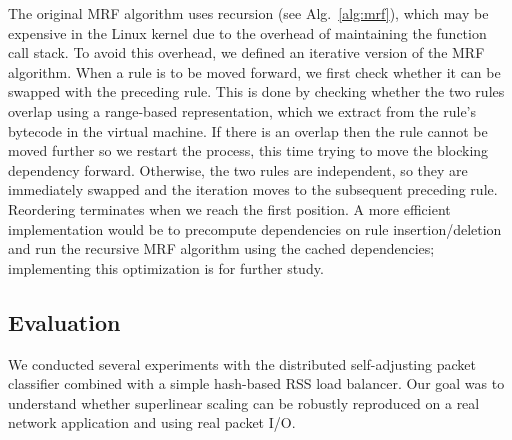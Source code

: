 The original MRF algorithm \cite{10228937} uses recursion (see Alg.~\ref{alg:mrf}), which may be expensive in the Linux kernel due to the overhead of maintaining the function call stack. To avoid this overhead, we defined an iterative version of the MRF algorithm. When a rule is to be moved forward, we first check whether it can be swapped with the preceding rule. This is done by checking whether the two rules overlap using a range-based representation, which we extract from the rule's bytecode in the \nftables virtual machine. If there is an overlap then the rule cannot be moved further so we restart the process, this time trying to move the blocking dependency forward. Otherwise, the two rules are independent, so they are immediately swapped and the iteration moves to the subsequent preceding rule. Reordering terminates when we reach the first position. A more efficient implementation would be to precompute dependencies on rule insertion\slash deletion and run the recursive MRF algorithm using the cached dependencies; implementing this optimization is for further study. %

\subsection{Evaluation}
\label{sec:sa-nf-tables-eval}

We conducted several experiments with the distributed self-adjusting packet classifier combined with a simple hash-based RSS load balancer. Our goal was to understand whether superlinear scaling can be robustly reproduced on a real network application and using real packet I/O. %

